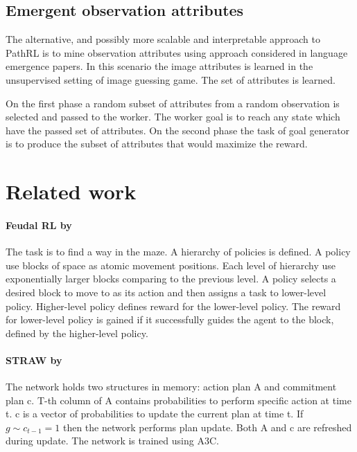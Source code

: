 \documentclass[acmsmall, nonacm]{acmart}
\begin{document}
\subsection{Emergent observation attributes}

The alternative, and possibly more scalable and interpretable approach to PathRL is to mine observation attributes using approach considered in language emergence papers. In this scenario the image attributes is learned in the unsupervised setting of image guessing game. The set of attributes is learned.

On the first phase a random subset of attributes from a random observation is selected and passed to the worker. The worker goal is to reach any state which have the passed set of attributes. On the second phase the task of goal generator is to produce the subset of attributes that would maximize the reward.

\section{Related work}
\label{sec:related_work}

\paragraph{Feudal RL by~\citet{Dayan1992FeudalRL}} %
\label{par:feudal_rl}

The task is to find a way in the maze. A hierarchy of policies is defined. A policy use blocks of space as atomic movement positions. Each level of hierarchy use exponentially larger blocks comparing to the previous level. A policy selects a desired block to move to as its action and then assigns a task to lower-level policy. Higher-level policy defines reward for the lower-level policy. The reward for lower-level policy is gained if it successfully guides the agent to the block, defined by the higher-level policy.


\paragraph{STRAW by~\citet{Vezhnevets2016StrategicAW}} %
\label{par:straw}

The network holds two structures in memory: action plan A and commitment plan c. T-th column of A contains probabilities to perform specific action at time t. c is a vector of probabilities to update the current plan at time t. If $g \sim c_{t-1} = 1$ then the network performs plan update. Both A and c are refreshed during update. The network is trained using A3C.
\end{document}
